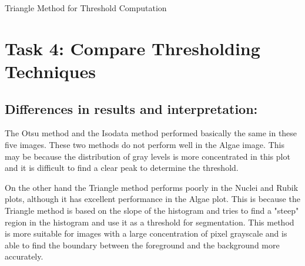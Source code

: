 \documentclass[11pt]{report}
\begin{document}
\begin{enumerate}
    \begin{algorithm}[H]

        \SetAlgoLined


        \;
        \caption{Triangle Method for Threshold Computation}
    \end{algorithm}


\end{enumerate}


\section*{Task 4: Compare Thresholding Techniques}

    \subsection*{Differences in results and interpretation:}
    The Otsu method and the Isodata method performed basically the same in these five images. These two methods do not perform well in the Algae image. This may be because the distribution of gray levels is more concentrated in this plot and it is difficult to find a clear peak to determine the threshold.

    On the other hand the Triangle method performs poorly in the Nuclei and Rubik plots, although it has excellent performance in the Algae plot. This is because the Triangle method is based on the slope of the histogram and tries to find a "steep" region in the histogram and use it as a threshold for segmentation. This method is more suitable for images with a large concentration of pixel grayscale and is able to find the boundary between the foreground and the background more accurately.
\end{document}
